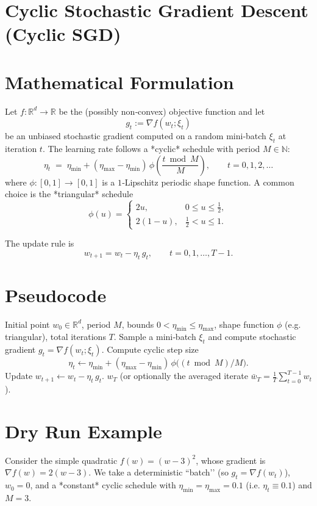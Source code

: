 \documentclass{article}
\newcommand{\RR}{\mathbb{R}}
\begin{document}
\section*{Cyclic Stochastic Gradient Descent (Cyclic SGD)}

\section*{Mathematical Formulation}
Let $f:\RR^{d}\to\RR$ be the (possibly non‑convex) objective function and let
\[
g_t:=\nabla f(w_t;\xi_t)
\]
be an unbiased stochastic gradient computed on a random mini‑batch $\xi_t$ at iteration $t$.
The learning rate follows a *cyclic* schedule with period $M\in\mathbb{N}$:
\[
\eta_t \;=\; \eta_{\min}+(\eta_{\max}-\eta_{\min})\,
\phi\!\left(\frac{t\bmod M}{M}\right),\qquad t=0,1,2,\dots
\tag{1}
\]
where $\phi:[0,1]\to[0,1]$ is a $1$‑Lipschitz periodic shape function.
A common choice is the *triangular* schedule
\[
\phi(u)=
\begin{cases}
2u, & 0\le u\le \tfrac12,\\[2mm]
2(1-u), & \tfrac12<u\le 1 .
\end{cases}
\tag{2}
\]

The update rule is
\[
w_{t+1}=w_{t}-\eta_t\, g_t,\qquad t=0,1,\dots,T-1.
\tag{3}
\]

\section*{Pseudocode}
\begin{algorithm}[H]
\caption{Cyclic SGD}
\begin{algorithmic}[1]
\Require Initial point $w_0\in\RR^d$, period $M$, bounds $0<\eta_{\min}\le\eta_{\max}$,
shape function $\phi$ (e.g. triangular), total iterations $T$.
    \State Sample a mini‑batch $\xi_t$ and compute stochastic gradient $g_t=\nabla f(w_t;\xi_t)$.
    \State Compute cyclic step size
    \[
      \eta_t\gets \eta_{\min}+(\eta_{\max}-\eta_{\min})\,
                \phi\!\bigl((t\bmod M)/M\bigr).
    \]
    \State Update $w_{t+1}\gets w_t-\eta_t\,g_t$.
\EndFor
\State \Return $w_T$ (or optionally the averaged iterate $\bar w_T=\frac1T\sum_{t=0}^{T-1}w_t$).
\end{algorithmic}
\end{algorithm}

\section*{Dry Run Example}
Consider the simple quadratic $f(w)=(w-3)^2$, whose gradient is $\nabla f(w)=2(w-3)$.
We take a deterministic “batch’’ (so $g_t=\nabla f(w_t)$), $w_0=0$, and a *constant* cyclic schedule
with $\eta_{\min}=\eta_{\max}=0.1$ (i.e. $\eta_t\equiv0.1$) and $M=3$.
\end{document}
